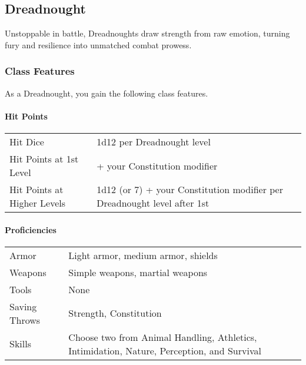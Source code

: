 \subsection{Dreadnought}\label{dreadnought-class}

Unstoppable in battle, Dreadnoughts draw strength from raw emotion,
turning fury and resilience into unmatched combat prowess.

\subsubsection{Class Features}\label{_class_features}

As a Dreadnought, you gain the following class features.

\paragraph{Hit Points}\label{_hit_points}

\begin{longtable}[]{@{}
  >{\raggedright\arraybackslash}p{}
  >{\raggedright\arraybackslash}p{}@{}}
\toprule\noalign{}
\endhead
\bottomrule\noalign{}
\endlastfoot
Hit Dice & 1d12 per Dreadnought level \\
Hit Points at 1st Level & 12 + your Constitution modifier \\
Hit Points at Higher Levels & 1d12 (or 7) + your Constitution modifier
per Dreadnought level after 1st \\
\end{longtable}

\paragraph{Proficiencies}\label{_proficiencies}

\begin{longtable}[]{@{}
  >{\raggedright\arraybackslash}p{}
  >{\raggedright\arraybackslash}p{}@{}}
\toprule\noalign{}
\endhead
\bottomrule\noalign{}
\endlastfoot
Armor & Light armor, medium armor, shields \\
Weapons & Simple weapons, martial weapons \\
Tools & None \\
Saving Throws & Strength, Constitution \\
Skills & Choose two from Animal Handling, Athletics, Intimidation,
Nature, Perception, and Survival \\
\end{longtable}

